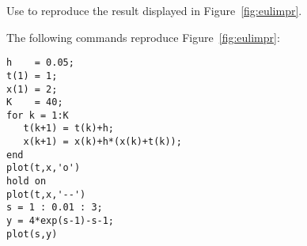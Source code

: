 \documentclass{ximera}
\begin{document}
\begin{exercise} \label{c15.1.6}
Use \Matlab to reproduce the result displayed in Figure~\ref{fig:eulimpr}.

\begin{solution}
The following \Matlab commands reproduce
Figure~\ref{fig:eulimpr}:
\begin{verbatim}
h    = 0.05;
t(1) = 1;
x(1) = 2;
K    = 40;
for k = 1:K
   t(k+1) = t(k)+h;
   x(k+1) = x(k)+h*(x(k)+t(k));
end
plot(t,x,'o')
hold on
plot(t,x,'--')
s = 1 : 0.01 : 3;
y = 4*exp(s-1)-s-1;
plot(s,y)
\end{verbatim}

\end{solution}
\end{exercise}
\end{document}

